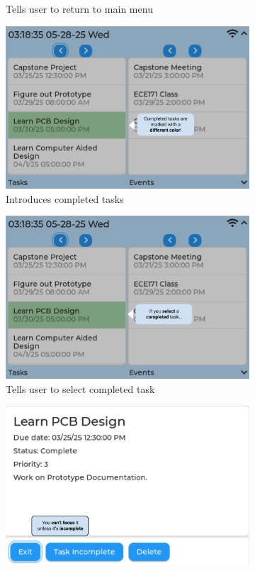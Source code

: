 \begin{figure}
\begin{subfigure}{0.5\textwidth}
        \caption{Tells user to return to main menu}
    \end{subfigure}
    \begin{subfigure}{0.5\textwidth}
        \includegraphics[width = \textwidth]{completed_task.png}
        \caption{Introduces completed tasks}
    \end{subfigure}
    \begin{subfigure}{0.5\textwidth}
        \includegraphics[width = \textwidth]{select_completed.png}
        \caption{Tells user to select completed task}
    \end{subfigure}
    \begin{subfigure}{0.5\textwidth}
        \includegraphics[width = \textwidth]{cant_focus.png}

\end{subfigure}
\end{figure}
